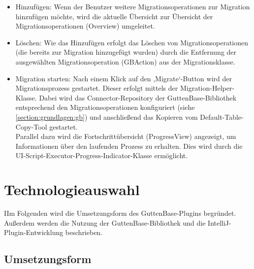 	\begin{itemize}
		\item Hinzufügen: Wenn der Benutzer weitere Migrationsoperationen zur Migration hinzufügen möchte, wird die aktuelle Übersicht zur Übersicht der Migrationsoperationen (Overview) umgeleitet.
		
		\item Löschen: Wie das Hinzufügen erfolgt das Löschen von Migrationsoperationen (die bereits zur Migration hinzugefügt wurden) durch die Entfernung der ausgewählten Migrationsoperation (GBAction) aus der Migrationsklasse.
		
		\item Migration starten: Nach einem Klick auf den ,Migrate‘-Button wird der Migrationsprozess gestartet. Dieser erfolgt mittels der Migration-Helper-Klasse. Dabei wird das Connector-Repository der GuttenBase-Bibliothek entsprechend den Migrationsoperationen konfiguriert (siehe \ref{section:grundlagen:gb}) und anschließend das Kopieren vom Default-Table-Copy-Tool gestartet.\\
		Parallel dazu wird die Fortschrittübersicht (ProgressView) angezeigt, um Informationen über den laufenden Prozess zu erhalten. Dies wird durch die UI-Script-Executor-Progress-Indicator-Klasse ermöglicht.
		
	\end{itemize}


\section{Technologieauswahl}
	IIm Folgenden wird die Umsetzungsform des GuttenBase-Plugins begründet. Außerdem werden die Nutzung der GuttenBase-Bibliothek und die IntelliJ-Plugin-Entwicklung beschrieben.
\subsection{Umsetzungsform}

